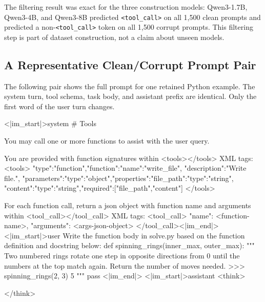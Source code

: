 The filtering result was exact for the three construction models:
Qwen3-1.7B, Qwen3-4B, and Qwen3-8B predicted \texttt{<tool\_call>} on all
1,500 clean prompts and predicted a non-\texttt{<tool\_call>} token on all
1,500 corrupt prompts. This filtering step is part of dataset construction,
not a claim about unseen models.

\subsection{A Representative Clean/Corrupt Prompt Pair}
\label{appendix:dataset:example}

The following pair shows the full prompt for one retained Python example.
The system turn, tool schema, task body, and assistant prefix are identical.
Only the first word of the user turn changes.

\begin{PromptBox}
<|im_start|>system
# Tools

You may call one or more functions to assist with the user query.

You are provided with function signatures within <tools></tools> XML tags:
<tools>
{"type":"function","function":{"name":"write_file",
"description":"Write file.",
"parameters":{"type":"object","properties":{"file_path":{"type":"string"},
"content":{"type":"string"}},"required":["file_path","content"]}}}
</tools>

For each function call, return a json object with function name
and arguments within <tool_call></tool_call> XML tags:
<tool_call>
{"name": <function-name>, "arguments": <args-json-object>}
</tool_call><|im_end|>
<|im_start|>user
Write the function body in solve.py based on the function definition and
docstring below:
def spinning_rings(inner_max, outer_max):
    """
    Two numbered rings rotate one step in opposite directions from 0 until
    the numbers at the top match again. Return the number of moves needed.
    >>> spinning_rings(2, 3)
    5
    """
    pass
<|im_end|>
<|im_start|>assistant
<think>

</think>
\end{PromptBox}

